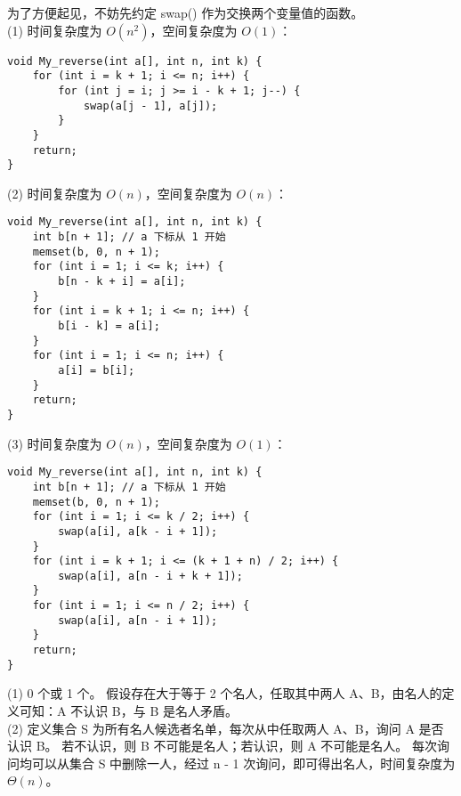 \documentclass[12pt, a4paper, oneside]{ctexart}
\begin{document}
\newpage
\begin{solution}[3.6]
为了方便起见，不妨先约定 swap() 作为交换两个变量值的函数。
\\(1) 时间复杂度为 $O(n^2)$，空间复杂度为 $O(1)$：
\begin{verbatim}
void My_reverse(int a[], int n, int k) {
    for (int i = k + 1; i <= n; i++) {
        for (int j = i; j >= i - k + 1; j--) {
            swap(a[j - 1], a[j]);
        }
    }
    return;
}
\end{verbatim}
(2) 时间复杂度为 $O(n)$，空间复杂度为 $O(n)$：
\begin{verbatim}
void My_reverse(int a[], int n, int k) {
    int b[n + 1]; // a 下标从 1 开始
    memset(b, 0, n + 1);
    for (int i = 1; i <= k; i++) {
        b[n - k + i] = a[i]; 
    }
    for (int i = k + 1; i <= n; i++) {
        b[i - k] = a[i];
    }
    for (int i = 1; i <= n; i++) {
        a[i] = b[i];
    }
    return;
}
\end{verbatim}
\newpage
(3) 时间复杂度为 $O(n)$，空间复杂度为 $O(1)$：
\begin{verbatim}
void My_reverse(int a[], int n, int k) {
    int b[n + 1]; // a 下标从 1 开始
    memset(b, 0, n + 1);
    for (int i = 1; i <= k / 2; i++) {
        swap(a[i], a[k - i + 1]);
    }
    for (int i = k + 1; i <= (k + 1 + n) / 2; i++) {
        swap(a[i], a[n - i + k + 1]);
    }
    for (int i = 1; i <= n / 2; i++) {
        swap(a[i], a[n - i + 1]);
    }
    return;
}
\end{verbatim}
\end{solution}

\begin{solution}[3.8]
(1) 0 个或 1 个。
假设存在大于等于 2 个名人，任取其中两人 A、B，由名人的定义可知：A 不认识 B，与 B 是名人矛盾。
\\(2) 定义集合 S 为所有名人候选者名单，每次从中任取两人 A、B，询问 A 是否认识 B。
若不认识，则 B 不可能是名人；若认识，则 A 不可能是名人。
每次询问均可以从集合 S 中删除一人，经过 n - 1 次询问，即可得出名人，时间复杂度为 $\Theta(n)$。
\end{solution}
\end{document}
